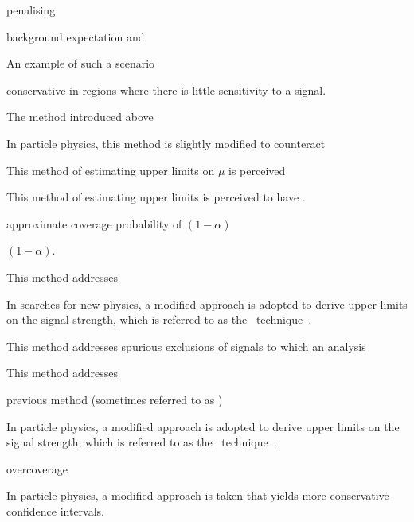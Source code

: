 penalising






background expectation and





An example of
such a scenario










conservative in regions where there is little sensitivity to a signal.






The method introduced above








In particle physics, this method is slightly modified to counteract



This method of estimating upper limits on $\mu$ is perceived


This method of estimating upper limits is perceived to have .

approximate coverage probability of $(1 - \alpha)$


$(1 - \alpha)$.

This method addresses

In searches for new physics, a modified approach is adopted to derive upper
limits on the signal strength, which is referred to as the
\CLs~technique~\cite{Junk:1999kv,Read:2002hq}.





This method addresses spurious exclusions of signals to which an analysis






This method addresses

previous method (sometimes referred to as \CLsb)







In particle physics, a modified approach is adopted to derive upper limits on
the signal strength, which is referred to as the
\CLs~technique~\cite{Junk:1999kv,Read:2002hq}.

overcoverage


In particle physics, a modified approach is taken that yields more conservative
confidence intervals.









